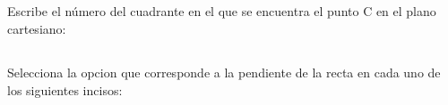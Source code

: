 \documentclass[12pt,addpoints]{evalua}
\begin{document}
\begin{questions}
      \subsection*{\else{}\fi}
      \question[2] Escribe el número del cuadrante en el que se encuentra el punto C en el plano cartesiano: \fillin[4 cuad.][1in]

      \newpage
      \subsection*{\else{}\fi}
      \question[8] Selecciona la opcion que corresponde a la pendiente de la recta en cada uno de los siguientes incisos:
      \begin{multicols}{2}
\end{multicols}
\end{questions}
\end{document}
